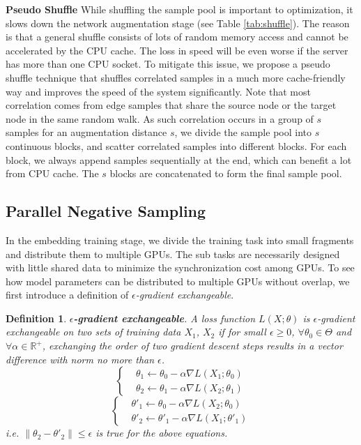 \documentclass[sigconf]{acmart}
\newcommand{\field}[1]{\mathbb{#1}}
\newcommand{\property}[1]{\textit{#1}}
\newtheorem{definition}{Definition}
\begin{document}
\noindent \textbf{Pseudo Shuffle}
While shuffling the sample pool is important to optimization, it slows down the network augmentation stage (see Table \ref{tab:shuffle}). The reason is that a general shuffle consists of lots of random memory access and cannot be accelerated by the CPU cache. The loss in speed will be even worse if the server has more than one CPU socket. To mitigate this issue, we propose a pseudo shuffle technique that shuffles correlated samples in a much more cache-friendly way and improves the speed of the system significantly. Note that most correlation comes from edge samples that share the source node or the target node in the same random walk. As such correlation occurs in a group of $s$ samples for an augmentation distance $s$, we divide the sample pool into $s$ continuous blocks, and scatter correlated samples into different blocks. For each block, we always append samples sequentially at the end, which can benefit a lot from CPU cache. The $s$ blocks are concatenated to form the final sample pool.

\subsection{Parallel Negative Sampling}
\label{sec:parallel_training}

In the embedding training stage, we divide the training task into small fragments and distribute them to multiple GPUs. The sub tasks are necessarily designed with little shared data to minimize the synchronization cost among GPUs. To see how model parameters can be distributed to multiple GPUs without overlap, we first introduce a definition of \property{$\epsilon$-gradient exchangeable}.

\begin{definition}
    \textbf{$\epsilon$-gradient exchangeable}. A loss function $L(X;\theta)$ is \property{$\epsilon$-gradient exchangeable} on two sets of training data $X_1$, $X_2$ if for small $\epsilon \geq 0$, $\forall \theta_0 \in \Theta$ and $\forall \alpha \in \field{R^+}$, exchanging the order of two gradient descent steps results in a vector difference with norm no more than $\epsilon$.
    \begin{equation}
        \begin{cases}
            & \theta_1 \gets \theta_0 - \alpha \nabla L(X_1;\theta_0) \\
            & \theta_2 \gets \theta_1 - \alpha \nabla L(X_2;\theta_1)
        \end{cases}
        \label{eq:order1}
    \end{equation}
    \begin{equation}
        \begin{cases}
            & \theta'_1 \gets \theta_0 - \alpha \nabla L(X_2;\theta_0) \\
            & \theta'_2 \gets \theta'_1 - \alpha \nabla L(X_1;\theta'_1)
        \end{cases}
        \label{eq:order2}
    \end{equation}
    i.e. $\lVert \theta_2 - \theta'_2 \rVert \leq \epsilon$ is true for the above equations.
\end{definition}
\end{document}
